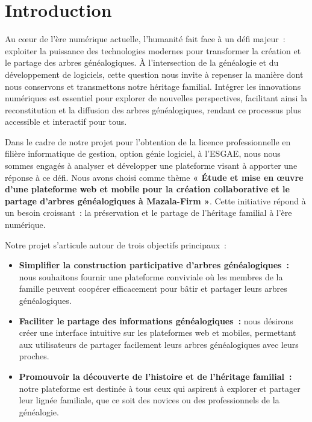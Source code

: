 \chapter*{Introduction}
\label{chap:introduction}
Au cœur de l’ère numérique actuelle, l’humanité fait face à un défi majeur :
exploiter la puissance des technologies modernes pour transformer la création
et le partage des arbres généalogiques. À l’intersection de la généalogie et
du développement de logiciels, cette question nous invite à repenser la
manière dont nous conservons et transmettons notre héritage familial.
Intégrer les innovations numériques est essentiel pour explorer de nouvelles
perspectives, facilitant ainsi la reconstitution et la diffusion des arbres
généalogiques, rendant ce processus plus accessible et interactif pour tous.


Dans le cadre de notre projet pour l’obtention de la licence professionnelle en
filière informatique de gestion, option génie logiciel, à l’\ac{ESGAE}, nous nous
sommes engagés à analyser et développer une plateforme visant à apporter une
réponse à ce défi. Nous avons choisi comme thème \textbf {« Étude et mise en œuvre d’une
plateforme web et mobile pour la création collaborative et le partage d’arbres
généalogiques à Mazala-Firm »}. Cette initiative répond à un besoin croissant :
la préservation et le partage de l’héritage familial à l’ère numérique.

Notre projet s’articule autour de trois objectifs principaux :

\begin{itemize}
  \item \textbf{Simplifier la construction participative d’arbres généalogiques :}
    nous souhaitons fournir une plateforme conviviale où les membres de
    la famille peuvent coopérer efficacement pour bâtir et partager leurs
    arbres généalogiques.

  \item \textbf{Faciliter le partage des informations généalogiques :} nous désirons
    créer une interface intuitive sur les plateformes web et mobiles,
    permettant aux utilisateurs de partager facilement leurs arbres
    généalogiques avec leurs proches.

  \item \textbf{Promouvoir la découverte de l’histoire et de l’héritage familial :}
    notre plateforme est destinée à tous ceux qui aspirent à explorer et
    partager leur lignée familiale, que ce soit des novices ou des
    professionnels de la généalogie.


\end{itemize}


